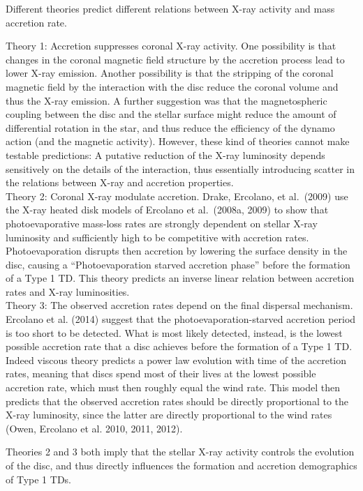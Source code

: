 Different theories predict different relations between X-ray activity 
and mass accretion rate. 

Theory 1: Accretion suppresses coronal X-ray activity.
One possibility is that changes in the coronal magnetic field
structure by the accretion process lead to lower X-ray emission.
Another possibility is that the stripping of the coronal magnetic field 
by the interaction with the disc reduce the coronal volume and thus the
X-ray emission. A further suggestion was that the magnetospheric coupling between the disc and the stellar surface  might reduce the amount of differential
rotation in the star, and thus reduce the efficiency of the dynamo action
(and the magnetic activity).
However, these kind of theories cannot make testable predictions: A putative
reduction of the X-ray luminosity depends sensitively on the details
of the interaction, thus essentially introducing scatter in the
relations between X-ray and accretion properties. \\
Theory 2: Coronal X-ray modulate accretion. 
Drake, Ercolano, et al.~(2009) use the X-ray heated 
disk models of Ercolano et al.~(2008a, 2009) to show that
photoevaporative mass-loss rates
are strongly dependent on stellar X-ray luminosity and sufficiently
high to be competitive with accretion rates. Photoevaporation disrupts
then accretion by lowering the surface density in the disc, causing a
``Photoevaporation starved accretion phase'' before the formation of a
Type 1 TD. This theory predicts an inverse linear relation between
accretion rates and X-ray luminosities. \\
Theory 3: The observed accretion rates depend on the final dispersal
mechanism. Ercolano
et al. (2014) suggest that
the photoevaporation-starved accretion period is too short to be
detected. What is most likely detected, instead, is the lowest
possible accretion rate that a disc achieves before the
formation of a Type 1 TD. Indeed viscous theory predicts a power law
evolution with time of the accretion rates, meaning that discs spend
most of their lives at the lowest possible accretion rate, which must
then roughly equal the wind rate. This model then predicts that the
observed accretion rates should be directly proportional to the X-ray
luminosity, since the latter are directly proportional to the wind
rates (Owen, Ercolano et al. 2010, 2011, 2012). 

Theories 2 and 3 both imply that the stellar X-ray activity controls the evolution of the disc,
and thus directly influences the formation
and accretion demographics of Type 1 TDs. 
\smallskip


